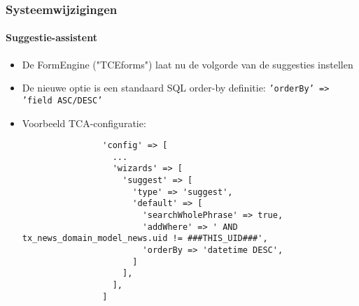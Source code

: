 \begin{frame}[fragile]
	\frametitle{Systeemwijzigingen}
	\framesubtitle{Suggestie-assistent}

	\lstset{basicstyle=\tiny\ttfamily}

	\begin{itemize}
		\item De FormEngine ("TCEforms") laat nu de volgorde van de suggesties instellen
		\item De nieuwe optie is een standaard SQL order-by definitie:\newline
			\small\texttt{'orderBy' => 'field ASC/DESC'}\normalsize
		\item Voorbeeld TCA-configuratie:

			\begin{lstlisting}
				'config' => [
				  ...
				  'wizards' => [
				    'suggest' => [
				      'type' => 'suggest',
				      'default' => [
				        'searchWholePhrase' => true,
				        'addWhere' => ' AND tx_news_domain_model_news.uid != ###THIS_UID###',
				        'orderBy => 'datetime DESC',
				      ]
				    ],
				  ],
				]
			\end{lstlisting}

	\end{itemize}

\end{frame}











